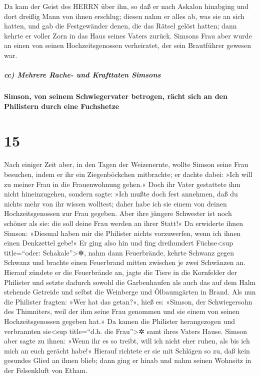 Da kam der Geist des HERRN über ihn, so daß er nach
Askalon hinabging und dort dreißig Mann von ihnen erschlug; diesen nahm
er alles ab, was sie an sich hatten, und gab die Festgewänder denen, die
das Rätsel gelöst hatten; dann kehrte er voller Zorn in das Haus seines
Vaters zurück. Simsons Frau aber wurde an einen von
seinen Hochzeitsgenossen verheiratet, der sein Brautführer gewesen war.

\hypertarget{cc-mehrere-rache--und-krafttaten-simsons}{%
\subparagraph{cc) Mehrere Rache- und Krafttaten
Simsons}\label{cc-mehrere-rache--und-krafttaten-simsons}}

\hypertarget{simson-von-seinem-schwiegervater-betrogen-ruxe4cht-sich-an-den-philistern-durch-eine-fuchshetze}{%
\paragraph{Simson, von seinem Schwiegervater betrogen, rächt sich an den
Philistern durch eine
Fuchshetze}\label{simson-von-seinem-schwiegervater-betrogen-ruxe4cht-sich-an-den-philistern-durch-eine-fuchshetze}}

\hypertarget{section-14}{%
\section{15}\label{section-14}}

Nach einiger Zeit aber, in den Tagen der Weizenernte,
wollte Simson seine Frau besuchen, indem er ihr ein Ziegenböckchen
mitbrachte; er dachte dabei: »Ich will zu meiner Frau in die
Frauenwohnung gehen.« Doch ihr Vater gestattete ihm nicht hineinzugehen,
sondern sagte: »Ich mußte doch fest annehmen, daß du
nichts mehr von ihr wissen wolltest; daher habe ich sie einem von deinen
Hochzeitsgenossen zur Frau gegeben. Aber ihre jüngere Schwester ist noch
schöner als sie: die soll deine Frau werden an ihrer Statt!«
Da erwiderte ihnen Simson: »Diesmal haben mir die
Philister nichts vorzuwerfen, wenn ich ihnen einen Denkzettel gebe!«
Er ging also hin und fing dreihundert Füchse\textless sup
title=``oder: Schakale''\textgreater✲, nahm dann Feuerbrände, kehrte
Schwanz gegen Schwanz und brachte einen Feuerbrand mitten zwischen je
zwei Schwänzen an. Hierauf zündete er die Feuerbrände an,
jagte die Tiere in die Kornfelder der Philister und setzte dadurch
sowohl die Garbenhaufen als auch das auf dem Halm stehende Getreide und
selbst die Weinberge und Ölbaumgärten in Brand. Als nun
die Philister fragten: »Wer hat das getan?«, hieß es: »Simson, der
Schwiegersohn des Thimniters, weil der ihm seine Frau genommen und sie
einem von seinen Hochzeitsgenossen gegeben hat.« Da kamen die Philister
herangezogen und verbrannten sie\textless sup title=``d.h. die
Frau''\textgreater✲ samt ihres Vaters Hause. Simson aber
sagte zu ihnen: »Wenn ihr es so treibt, will ich nicht eher ruhen, als
bis ich mich an euch gerächt habe!« Hierauf richtete er
sie mit Schlägen so zu, daß kein gesundes Glied an ihnen blieb; dann
ging er hinab und nahm seinen Wohnsitz in der Felsenkluft von Etham.

